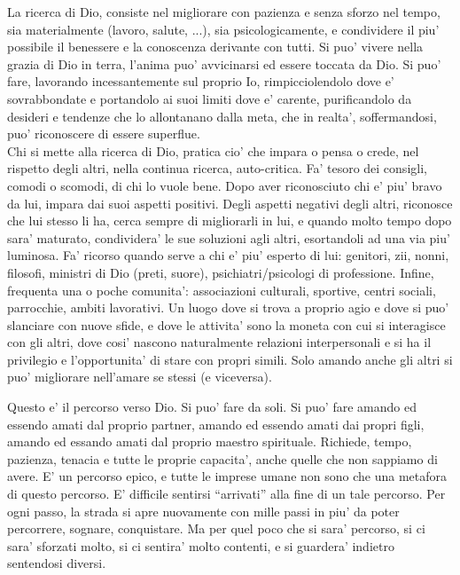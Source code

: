 La ricerca di Dio, consiste nel migliorare con pazienza e senza sforzo nel tempo, sia materialmente (lavoro, salute, ...), sia psicologicamente, e condividere il piu' possibile il benessere e la conoscenza derivante con tutti. Si puo' vivere nella grazia di Dio in terra, l'anima puo' avvicinarsi ed essere toccata da Dio.
Si puo' fare, lavorando incessantemente sul proprio Io, rimpicciolendolo dove e' sovrabbondate e portandolo ai suoi limiti dove e' carente, purificandolo da desideri e tendenze che lo allontanano dalla meta, che in realta', soffermandosi, puo' riconoscere di essere superflue. \\
Chi si mette alla ricerca di Dio, pratica cio' che impara o pensa o crede, nel rispetto degli altri, nella continua ricerca, auto-critica. Fa' tesoro dei consigli, comodi o scomodi, di chi lo vuole bene. Dopo aver riconosciuto chi e' piu' bravo da lui, impara dai suoi aspetti positivi. Degli aspetti negativi degli altri, riconosce che lui stesso li ha, cerca sempre di migliorarli in lui, e quando molto tempo dopo sara' maturato, condividera' le sue soluzioni agli altri, esortandoli ad una via piu' luminosa. 
Fa' ricorso quando serve a chi e' piu' esperto di lui: genitori, zii, nonni, filosofi, ministri di Dio (preti, suore), psichiatri/psicologi di professione.
Infine, frequenta una o poche comunita': associazioni culturali, sportive, centri sociali, parrocchie, ambiti lavorativi. Un luogo dove si trova a proprio agio e dove si puo' slanciare con nuove sfide, e dove le attivita' sono la moneta con cui si interagisce con gli altri, dove cosi' nascono naturalmente relazioni interpersonali e si ha il privilegio e l'opportunita' di stare con propri simili. Solo amando anche gli altri si puo' migliorare nell'amare se stessi (e viceversa).

Questo e' il percorso verso Dio. Si puo' fare da soli. Si puo' fare amando ed essendo amati dal proprio partner, amando ed essendo amati dai propri figli, amando ed essando amati dal proprio maestro spirituale. Richiede, tempo, pazienza, tenacia e tutte le proprie capacita', anche quelle che non sappiamo di avere. E' un percorso epico, e tutte le imprese umane non sono che una metafora di questo percorso.
E' difficile sentirsi ``arrivati'' alla fine di un tale percorso. Per ogni passo, la strada si apre nuovamente con mille passi in piu' da poter percorrere, sognare, conquistare. Ma per quel poco che si sara' percorso, si ci sara' sforzati molto, si ci sentira' molto contenti, e si guardera' indietro sentendosi diversi.



